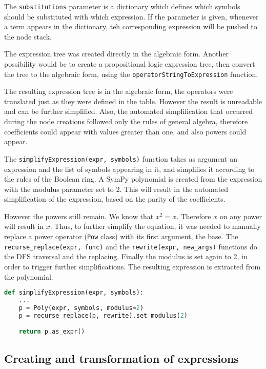 The \verb|substitutions| parameter is a dictionary which defines which symbols should be substituted with which expression. If the parameter is given, whenever a term appears in the dictionary, teh corresponding expression will be pushed to the node stack. 

The expression tree was created directly in the algebraic form. Another possibility would be to create a propositional logic expression tree, then convert the tree to the algebraic form, using the \verb|operatorStringToExpression| function.

The resulting expression tree is in the algebraic form, the operators were translated just as they were defined in the table. However the result is unreadable and can be further simplified. Also, the automated simplification that occurred during the node creations followed only the rules of general algebra, therefore coefficients could appear with values greater than one, and also powers could appear.

The \verb|simplifyExpression(expr, symbols)| function takes as argument an expression and the list of symbols appearing in it, and simplifies it according to the rules of the Boolean ring. A SymPy polynomial is created from the expression with the modulus parameter set to 2. This will result in the automated simplification of the expression, based on the parity of the coefficients. 

However the powers still remain. We know that $x^2 = x$. Therefore $x$ on any power will result in $x$. Thus, to further simplify the equation, it was needed to manually replace a power operator (\verb|Pow| class) with its first argument, the base. The \verb|recurse_replace(expr, func)| and the \verb|rewrite(expr, new_args)| functions do the DFS traversal and the replacing. Finally the modulus is set again to 2, in order to trigger further simplifications. The resulting expression is extracted from the polynomial.

\begin{lstlisting}[language=Python, numbers=none, caption=Simplification on the Boolean ring using SymPy]
def simplifyExpression(expr, symbols):
    ...
    p = Poly(expr, symbols, modulus=2)
    p = recurse_replace(p, rewrite).set_modulus(2)

    return p.as_expr()
\end{lstlisting}




\subsection{Creating and transformation of expressions}

